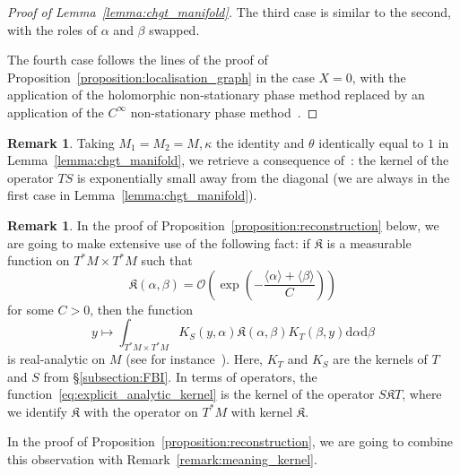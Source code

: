 \documentclass[10pt]{amsart}
\theoremstyle{definition}\newtheorem{defi}[theo]{Definition}\newtheorem{rema}[theo]{Remark}\newtheorem{exam}[theo]{Example}\newtheorem{exem}[theo]{Example}\newtheorem{nota}[theo]{Notation}
\newcommand{\p}[1]{\left(#1\right)}
\newcommand{\brac}[1]{\langle #1 \rangle}
\newcommand{\clO}{\mathcal{O}}
\newcommand{\fkK}{\mathfrak{K}}
\newcommand{\rmd}{\mathrm{d}}
\begin{document}
\begin{proof}[Proof of Lemma~\ref{lemma:chgt_manifold}]
The third case is similar to the second, with the roles of $\alpha$ and $\beta$ swapped.

The fourth case follows the lines of the proof of Proposition~\ref{proposition:localisation_graph} in the case $X = 0$, with the application of the holomorphic non-stationary phase method replaced by an application of the $C^\infty$ non-stationary phase method~\cite[Theorem~7.7.1]{hormander_book_1}.
\end{proof}

\begin{rema}\label{remark:TS_away_diagonal}
Taking $M_1 = M_2 = M, \kappa$ the identity and $\theta$ identically equal to $1$ in Lemma~\ref{lemma:chgt_manifold}, we retrieve a consequence of~\cite[Lemma~2.9]{BJ20}: the kernel of the operator $TS$ is exponentially small away from the diagonal (we are always in the first case in Lemma~\ref{lemma:chgt_manifold}).
\end{rema}

\begin{rema}\label{remark:small_to_analytic}
In the proof of Proposition~\ref{proposition:reconstruction} below, we are going to make extensive use of the following fact: if $\fkK$ is a measurable function on $T^* M \times T^*M$ such that
\begin{equation}\label{eq:meaning_exponentially_small}
\fkK(\alpha,\beta) = \clO\p{\exp\p{- \frac{\brac{\alpha} + \brac{\beta}}{C}}}
\end{equation}
for some $C > 0$, then the function
\begin{equation}\label{eq:explicit_analytic_kernel}
y \mapsto \int_{T^* M \times T^* M} K_S(y,\alpha) \fkK(\alpha,\beta) K_T(\beta,y) \rmd \alpha \rmd \beta
\end{equation}
is real-analytic on $M$ (see for instance~\cite[Lemmas~2.5 and 2.6]{BJ20}). Here, $K_T$ and $K_S$ are the kernels of $T$ and $S$ from \S \ref{subsection:FBI}. In terms of operators, the function~\eqref{eq:explicit_analytic_kernel} is the kernel of the operator $S \fkK T$, where we identify $\fkK$ with the operator on $T^* M$ with kernel $\fkK$.

In the proof of Proposition~\ref{proposition:reconstruction}, we are going to combine this observation with Remark~\ref{remark:meaning_kernel}.
\end{rema}
\end{document}
